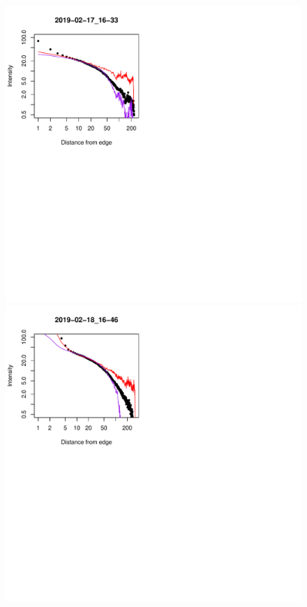 \documentclass[final,hyperref={pdfpagelabels=false}]{beamer}
\begin{document}
\begin{frame}[t]
\begin{columns}[t]
\begin{column}{.23\textwidth}
\begin{block}{}
\begin{figure}
\includegraphics[scale=1.08,viewport=2 261 232 496,clip]{fig/slopes_compared_2019-02-17_16-33.pdf}
\includegraphics[scale=1.08,viewport=2 261 232 496,clip]{fig/slopes_compared_2019-02-18_16-46.pdf}

\end{figure}
\end{block}
\end{column}
\end{columns}
\end{frame}
\end{document}
